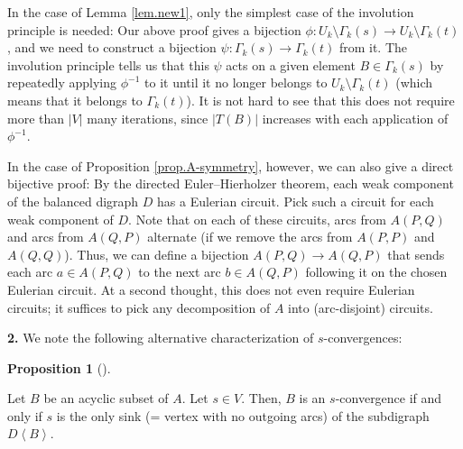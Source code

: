 \documentclass[numbers=enddot,12pt,final,onecolumn,notitlepage]{scrartcl}%
\theoremstyle{definition}
\newtheorem{prop}[theo]{Proposition}
\newenvironment{proposition}[1][]
{\begin{prop}[#1]\begin{leftbar}}
{\end{leftbar}\end{prop}}
\theoremstyle{plainsl}
\begin{document}
In the case of Lemma \ref{lem.new1}, only the simplest case of the involution
principle is needed: Our above proof gives a bijection $\phi:U_{k}%
\setminus\Gamma_{k}\left(  s\right)  \rightarrow U_{k}\setminus\Gamma
_{k}\left(  t\right)  $, and we need to construct a bijection $\psi:\Gamma
_{k}\left(  s\right)  \rightarrow\Gamma_{k}\left(  t\right)  $ from it. The
involution principle tells us that this $\psi$ acts on a given element
$B\in\Gamma_{k}\left(  s\right)  $ by repeatedly applying $\phi^{-1}$ to it
until it no longer belongs to $U_{k}\setminus\Gamma_{k}\left(  t\right)  $
(which means that it belongs to $\Gamma_{k}\left(  t\right)  $). It is not
hard to see that this does not require more than $\left\vert V\right\vert $
many iterations, since $\left\vert T\left(  B\right)  \right\vert $ increases
with each application of $\phi^{-1}$.

In the case of Proposition \ref{prop.A-symmetry}, however, we can also give a
direct bijective proof: By the directed Euler--Hierholzer theorem, each weak
component of the balanced digraph $D$ has a Eulerian circuit. Pick such a
circuit for each weak component of $D$. Note that on each of these circuits,
arcs from $A\left(  P,Q\right)  $ and arcs from $A\left(  Q,P\right)  $
alternate (if we remove the arcs from $A\left(  P,P\right)  $ and $A\left(
Q,Q\right)  $). Thus, we can define a bijection $A\left(  P,Q\right)
\rightarrow A\left(  Q,P\right)  $ that sends each arc $a\in A\left(
P,Q\right)  $ to the next arc $b\in A\left(  Q,P\right)  $ following it on the
chosen Eulerian circuit. At a second thought, this does not even require
Eulerian circuits; it suffices to pick any decomposition of $A$ into
(arc-disjoint) circuits.

\bigskip

\textbf{2.} We note the following alternative characterization of $s$-convergences:

\begin{proposition}
\label{prop.s-conv.2}Let $B$ be an acyclic subset of $A$. Let $s\in V$. Then,
$B$ is an $s$-convergence if and only if $s$ is the only sink (= vertex with
no outgoing arcs) of the subdigraph $D\left\langle B\right\rangle $.
\end{proposition}
\end{document}
